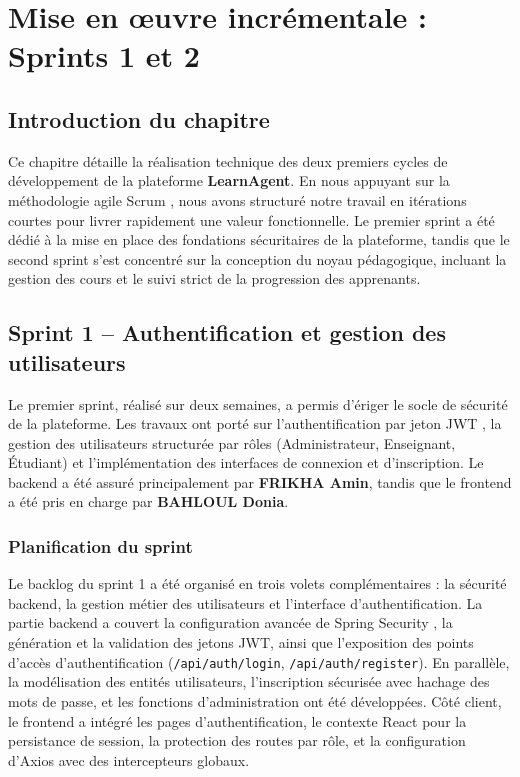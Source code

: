 \documentclass[12pt,a4paper]{report}
\begin{document}
\newpage

\chapter{Mise en œuvre incrémentale : Sprints 1 et 2}

\section*{Introduction du chapitre}
Ce chapitre détaille la réalisation technique des deux premiers cycles de développement de la plateforme \textbf{LearnAgent}. En nous appuyant sur la méthodologie agile Scrum \cite{scrum_guide}, nous avons structuré notre travail en itérations courtes pour livrer rapidement une valeur fonctionnelle. Le premier sprint a été dédié à la mise en place des fondations sécuritaires de la plateforme, tandis que le second sprint s'est concentré sur la conception du noyau pédagogique, incluant la gestion des cours et le suivi strict de la progression des apprenants.

\section{Sprint 1 -- Authentification et gestion des utilisateurs}

Le premier sprint, réalisé sur deux semaines, a permis d'ériger le socle de sécurité de la plateforme. Les travaux ont porté sur l’authentification par jeton JWT \cite{jwt_rfc}, la gestion des utilisateurs structurée par rôles (Administrateur, Enseignant, Étudiant) et l’implémentation des interfaces de connexion et d’inscription. Le backend a été assuré principalement par \textbf{FRIKHA Amin}, tandis que le frontend a été pris en charge par \textbf{BAHLOUL Donia}.

\subsection{Planification du sprint}

Le backlog du sprint 1 a été organisé en trois volets complémentaires : la sécurité backend, la gestion métier des utilisateurs et l’interface d’authentification. La partie backend a couvert la configuration avancée de Spring Security \cite{spring_security}, la génération et la validation des jetons JWT, ainsi que l'exposition des points d’accès d’authentification (\texttt{/api/auth/login}, \texttt{/api/auth/register}). En parallèle, la modélisation des entités utilisateurs, l’inscription sécurisée avec hachage des mots de passe, et les fonctions d’administration ont été développées. Côté client, le frontend a intégré les pages d’authentification, le contexte React \cite{react_docs} pour la persistance de session, la protection des routes par rôle, et la configuration d’Axios avec des intercepteurs globaux.
\end{document}
